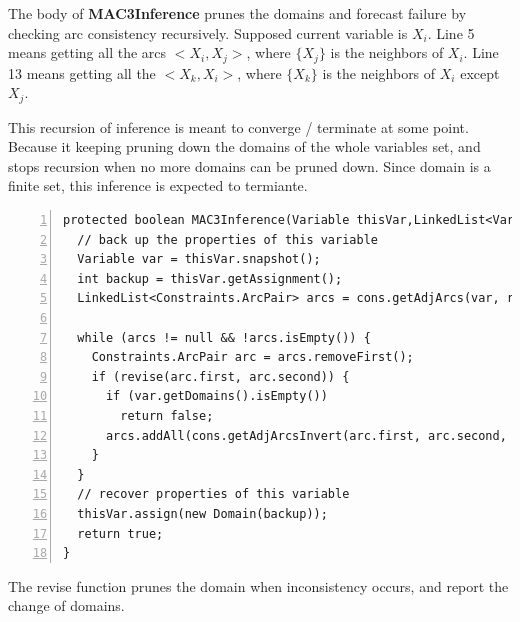 \documentclass{article}
\begin{document}
The body of \textbf{MAC3Inference} prunes the domains and forecast failure by checking arc consistency recursively. Supposed current variable is $X_i$. Line 5 means getting all the arcs $<X_i, X_j>$, where $\{X_j\}$ is the neighbors of $X_i$. Line 13 means getting all the $<X_k, X_i>$, where $\{X_k\}$ is the neighbors of $X_i$ except $X_j$.

This recursion of inference is meant to converge / terminate at some point.  Because it keeping pruning down the domains of the whole variables set, and stops recursion when no more domains can be pruned down. Since domain is a finite set, this inference is expected to termiante.

\begin{lstlisting}[numbers=left]   
protected boolean MAC3Inference(Variable thisVar,LinkedList<Variable> remain){
  // back up the properties of this variable
  Variable var = thisVar.snapshot();
  int backup = thisVar.getAssignment();
  LinkedList<Constraints.ArcPair> arcs = cons.getAdjArcs(var, remain);

  while (arcs != null && !arcs.isEmpty()) {
    Constraints.ArcPair arc = arcs.removeFirst();
    if (revise(arc.first, arc.second)) {
      if (var.getDomains().isEmpty())
        return false;
      arcs.addAll(cons.getAdjArcsInvert(arc.first, arc.second, remain));
    }
  }
  // recover properties of this variable
  thisVar.assign(new Domain(backup));
  return true;
}
\end{lstlisting}

The revise function prunes the domain when inconsistency occurs, and report the change of domains.
\end{document}
